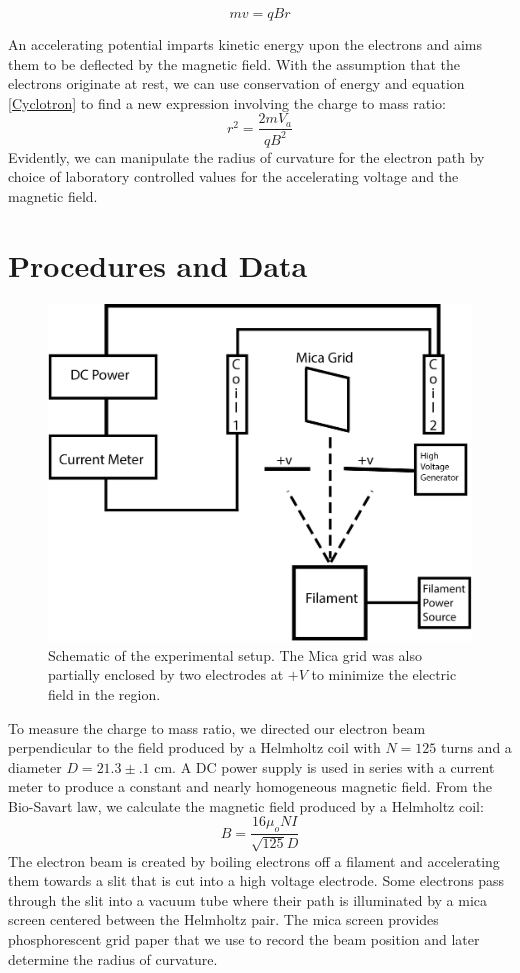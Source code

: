 \documentclass[12pt]{article}
\begin{document}
\begin{equation}\label{Cyclotron}
    mv = qBr
\end{equation}

An accelerating potential imparts kinetic energy upon the electrons and aims them to be deflected by the magnetic field. With the assumption that the electrons originate at rest, we can use conservation of energy and equation \ref{Cyclotron} to find a new expression involving the charge to mass ratio:
\begin{equation}\label{Energy}
    r^2 = \frac{2mV_a}{qB^2}
\end{equation}
Evidently, we can manipulate the radius of curvature for the electron path by choice of laboratory controlled values for the accelerating voltage and the magnetic field.  



\section{Procedures and Data}

\begin{figure}[t]
  \centering
  \includegraphics[width=.6\textwidth]{BlockDiagram.png}
  \caption{Schematic of the experimental setup. The Mica grid was also partially enclosed by two electrodes at $+V$ to minimize the electric field in the region.}

\end{figure}

To measure the charge to mass ratio, we directed our electron beam perpendicular to the field produced by a Helmholtz coil with $N = 125$ turns and a diameter $D = 21.3 \pm .1$ cm. A DC power supply is used in series with a current meter to produce a constant and nearly homogeneous magnetic field. From the Bio-Savart law, we calculate the magnetic field produced by a Helmholtz coil:
\begin{equation}
B = \frac{16 {\mu}_o N I}{\sqrt{125}D} 
\label{BField}
\end{equation}
The electron beam is created by boiling electrons off a filament and accelerating them towards a slit that is cut into a high voltage electrode. Some electrons pass through the slit into a vacuum tube where their path is illuminated by a mica screen centered between the Helmholtz pair. The mica screen provides phosphorescent grid paper that we use to record the beam position and later determine the radius of curvature. 
\end{document}
